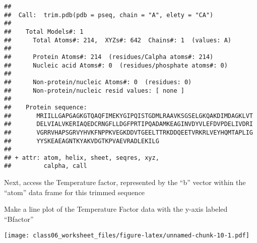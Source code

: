 \documentclass[]{article}
\newenvironment{Shaded}{\begin{snugshade}}{\end{snugshade}}
\newcommand{\KeywordTok}[1]{\textcolor[rgb]{0.13,0.29,0.53}{\textbf{#1}}}
\newcommand{\DataTypeTok}[1]{\textcolor[rgb]{0.13,0.29,0.53}{#1}}
\newcommand{\StringTok}[1]{\textcolor[rgb]{0.31,0.60,0.02}{#1}}
\newcommand{\OperatorTok}[1]{\textcolor[rgb]{0.81,0.36,0.00}{\textbf{#1}}}
\newcommand{\NormalTok}[1]{#1}
\begin{document}
\begin{verbatim}
## 
##  Call:  trim.pdb(pdb = pseq, chain = "A", elety = "CA")
## 
##    Total Models#: 1
##      Total Atoms#: 214,  XYZs#: 642  Chains#: 1  (values: A)
## 
##      Protein Atoms#: 214  (residues/Calpha atoms#: 214)
##      Nucleic acid Atoms#: 0  (residues/phosphate atoms#: 0)
## 
##      Non-protein/nucleic Atoms#: 0  (residues: 0)
##      Non-protein/nucleic resid values: [ none ]
## 
##    Protein sequence:
##       MRIILLGAPGAGKGTQAQFIMEKYGIPQISTGDMLRAAVKSGSELGKQAKDIMDAGKLVT
##       DELVIALVKERIAQEDCRNGFLLDGFPRTIPQADAMKEAGINVDYVLEFDVPDELIVDRI
##       VGRRVHAPSGRVYHVKFNPPKVEGKDDVTGEELTTRKDDQEETVRKRLVEYHQMTAPLIG
##       YYSKEAEAGNTKYAKVDGTKPVAEVRADLEKILG
## 
## + attr: atom, helix, sheet, seqres, xyz,
##         calpha, call
\end{verbatim}

Next, access the Temperature factor, represented by the ``b'' vector
within the ``atom'' data frame for this trimmed sequence

\begin{Shaded}
\end{Shaded}

Make a line plot of the Temperature Factor data with the y-axis labeled
``Bfactor''

\begin{Shaded}
\end{Shaded}

\texttt{[image: class06\_worksheet\_files/figure-latex/unnamed-chunk-10-1.pdf]}
\end{document}
